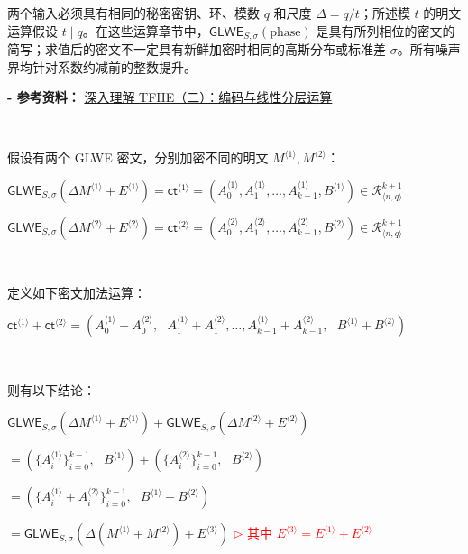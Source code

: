 两个输入必须具有相同的秘密密钥、环、模数 $q$ 和尺度 $\Delta=q/t$；所述模 $t$ 的明文运算假设 $t\mid q$。在这些运算章节中，$\textsf{GLWE}_{S,\sigma}(\text{phase})$ 是具有所列相位的密文的简写；求值后的密文不一定具有新鲜加密时相同的高斯分布或标准差 $\sigma$。所有噪声界均针对系数约减前的整数提升。

\textbf{- 参考资料：}
\href{https://www.zama.ai/post/tfhe-deep-dive-part-2}{深入理解 TFHE（二）：编码与线性分层运算}~\cite{tfhe-2}


$ $

假设有两个 GLWE 密文，分别加密不同的明文 $M^{\langle 1 \rangle}, M^{\langle 2 \rangle}$：

$\textsf{GLWE}_{S, \sigma}(\Delta M^{\langle 1 \rangle} + E^{\langle 1 \rangle}) = \textsf{ct}^{\langle 1 \rangle} = ( A_0^{\langle 1 \rangle}, A_1^{\langle 1 \rangle}, \ldots, A_{k-1}^{\langle 1 \rangle}, B^{\langle 1 \rangle}) \in \mathcal{R}_{\langle n,q \rangle}^{k + 1}$

$\textsf{GLWE}_{S, \sigma}(\Delta M^{\langle 2 \rangle} + E^{\langle 2 \rangle}) = \textsf{ct}^{\langle 2 \rangle} = ( A_0^{\langle 2 \rangle}, A_1^{\langle 2 \rangle}, \ldots, A_{k-1}^{\langle 2 \rangle}, B^{\langle 2 \rangle}) \in \mathcal{R}_{\langle n,q \rangle}^{k + 1}$

$ $

\noindent 定义如下密文加法运算：

$\textsf{ct}^{\langle 1 \rangle} + \textsf{ct}^{\langle 2 \rangle} = ( A_0^{\langle 1 \rangle} + A_0^{\langle 2 \rangle}, \text{ } A_1^{\langle 1 \rangle} + A_1^{\langle 2 \rangle}, \ldots, A_{k-1}^{\langle 1 \rangle} + A_{k-1}^{\langle 2 \rangle}, \text{ } B^{\langle 1 \rangle} + B^{\langle 2 \rangle} )$

$ $

\noindent 则有以下结论：

\begin{tcolorbox}[title={\textbf{\tboxlabel{\ref*{sec:glwe-add-cipher}} GLWE 同态加法}}]
$\textsf{GLWE}_{S, \sigma}(\Delta M^{\langle 1 \rangle} + E^{\langle 1 \rangle} ) + \textsf{GLWE}_{S, \sigma}(\Delta M^{\langle 2 \rangle} + E^{\langle 2 \rangle}) $

$ = ( \{A_i^{\langle 1 \rangle}\}_{i=0}^{k-1}, \text{ } B^{\langle 1 \rangle}) + (\{A_i^{\langle 2 \rangle}\}_{i=0}^{k-1}, \text{ } B^{\langle 2 \rangle}) $

$ = ( \{A_i^{\langle 1 \rangle} + A_i^{\langle 2 \rangle}\}_{i=0}^{k-1}, \text{ } B^{\langle 1 \rangle} + B^{\langle 2 \rangle} ) $

$= \textsf{GLWE}_{S, \sigma}(\Delta(M^{\langle 1 \rangle} + M^{\langle 2 \rangle}) + E^{\langle 3 \rangle})$ \textcolor{red}{ $\rhd$ 其中 $E^{\langle 3 \rangle} = E^{\langle 1  \rangle} + E^{\langle 2 \rangle}$}
\end{tcolorbox}


